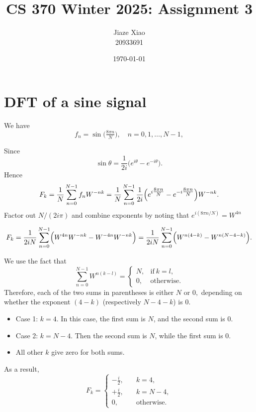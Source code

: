 \documentclass{article}
\title{\textbf{CS 370 Winter 2025: Assignment 3}}
\author{Jiaze Xiao \\ 20933691}
\date{\today}
\begin{document}
\maketitle

\section{DFT of a sine signal}
We have
$$
    f_n =\sin\bigl(\tfrac{8\pi n}{N}\bigr),
    \quad n=0,1,\dots,N-1,
$$

Since
$$
    \sin\theta =\frac{1}{2i}
    \bigl(e^{i\theta} - e^{-i\theta}\bigr).
$$
Hence
$$
    F_k
    =
    \frac{1}{N}\sum_{n=0}^{N-1} f_n W^{-nk}
    =
    \frac{1}{N}\sum_{n=0}^{N-1}
    \frac{1}{2i}\Bigl(
    e^{i\tfrac{8\pi n}{N}}
    -
    e^{-i\tfrac{8\pi n}{N}}
    \Bigr)
    W^{-nk}.
$$
Factor out $N/(2i\pi)$ and combine exponents by noting that
$
    e^{i(8\pi n/N)} = W^{4n}
$

$$
    F_k
    =
    \frac{1}{2iN}\sum_{n=0}^{N-1}
    \Bigl(
    W^{4n}W^{-nk}
    -
    W^{-4n}W^{-nk}
    \Bigr)
    =
    \frac{1}{2iN}\sum_{n=0}^{N-1}
    \Bigl(
    W^{n(4-k)}
    -
    W^{n(N -4 - k)}
    \Bigr).
$$

We use the fact that
$$
    \sum_{n=0}^{N-1} W^{n(k-l)}
    =
    \begin{cases}
        N, & \text{if}\ k=l,   \\
        0, & \text{otherwise}.
    \end{cases}
$$
Therefore, each of the two sums in parentheses is either $N$ or $0,$ depending on whether the exponent $(4-k)$ (respectively $N -4 - k$) is $0.$

\begin{itemize}
    \item Case 1: $k=4$. In this case, the first sum is $N$, and the second sum is $0$.
    \item Case 2: $k=N-4$. Then the second sum is $N$, while the first sum is $0$.
    \item All other $k$ give zero for both sums.
\end{itemize}

As a result,
$$
    \boxed{
        F_k
        =
        \begin{cases}
            \displaystyle
            -\tfrac{i}{2},
            \quad & k = 4,            \\
            \displaystyle
            +\tfrac{i}{2},
            \quad & k = N-4,          \\
            0,    & \text{otherwise}.
        \end{cases}
    }
$$
\end{document}
